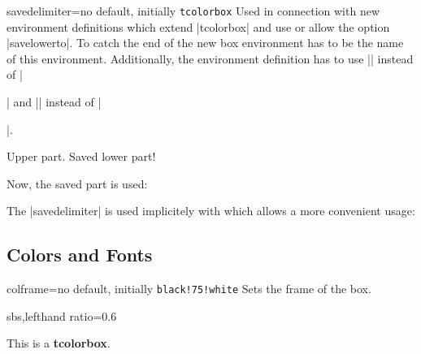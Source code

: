 \clearpage
\begin{docTcbKey}{savedelimiter}{=}{no default, initially \texttt{tcolorbox}}
  Used in connection with new environment definitions which extend
  |tcolorbox| and use or allow the option |savelowerto|.
  To catch the end of the new box environment  has to be the name of
  this environment. Additionally, the environment definition has to use
  |\tcolorbox| instead of
  |\begin{tcolorbox}| and |\endtcolorbox| instead of |\end{tcolorbox}|.
\begin{dispExample}
\newenvironment{mybox}[1]{%
  \tcolorbox[savedelimiter=mybox,
             savelowerto=\jobname_bspsave2.tex,lowerbox=ignored,
             colback=red!5!white,colframe=red!75!black,fonttitle=\bfseries,
             title=#1]}%
  {\endtcolorbox}

\begin{mybox}{My Example}
Upper part.
\tcblower
Saved lower part!
\end{mybox}

Now, the saved part is used:
\begin{tcolorbox}[colback=green!5]

\end{tcolorbox}
\end{dispExample}

The |savedelimiter| is used implicitely with  which
allows a more convenient usage:
\end{docTcbKey}



\clearpage
\subsection{Colors and Fonts}
\begin{docTcbKey}{colframe}{=}{no default, initially \texttt{black!75!white}}
  Sets the frame  of the box.
\begin{dispExample*}{sbs,lefthand ratio=0.6}
\begin{tcolorbox}[colframe=red!50!white]
This is a \textbf{tcolorbox}.
\end{tcolorbox}
\end{dispExample*}
\end{docTcbKey}

